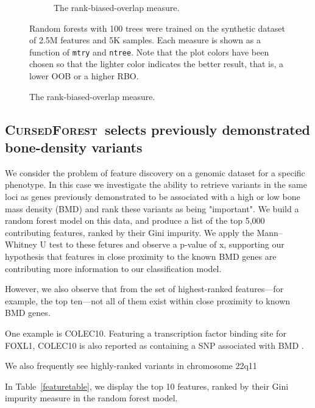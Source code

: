 \documentclass[10pt,letterpaper]{article}
\newcommand{\cursedforest}{\textsc{CursedForest}\xspace}
\newcommand{\mtry}{\texttt{mtry}\xspace}
\newcommand{\ntree}{\texttt{ntree}\xspace}
\begin{document}
\begin{figure}[tbhp]
\begin{adjustwidth}{-1.00in}{0in}
\begin{subfigure}[b]{0.5\linewidth}
      \caption{The rank-biased-overlap measure.} 
      \label{figure:rbo-prod.png} 
      \vspace{4ex}
    \end{subfigure} 
    \begin{flushleft} 
      Random forests with 100 trees were trained on the synthetic dataset of 2.5M features and 5K samples.
      Each measure is shown as a function of \mtry and \ntree. Note that the plot colors have been chosen so that the lighter color indicates
      the better result, that is, a lower OOB or a higher RBO.
    \end{flushleft}
  \end{adjustwidth}
\end{figure}

\subsection{\cursedforest\ selects previously demonstrated bone-density variants}
We consider the problem of feature discovery on a genomic dataset for a specific phenotype.
In this case we investigate the ability to retrieve variants in the same loci as genes previously demonstrated to
be associated with a high or low bone mass density (BMD) and rank these variants as being "important".
We build a random forest model on this data, and produce a list of the top 5,000 contributing features, ranked by their
Gini impurity. We apply the Mann–Whitney U test to these fetures and observe a p-value of x, supporting our hypothesis
that features in close proximity to the known BMD genes are contributing more information to our classification model.

However, we also observe that from the set of highest-ranked features---for example, the top ten---not all of them exist
within close proximity to known BMD genes.

One example is COLEC10. Featuring a transcription factor binding site for FOXL1, COLEC10 is also reported as containing a SNP
associated with BMD \cite{Liu2008}.

We also frequently see highly-ranked variants in chromosome 22q11


In Table~\ref{featuretable}, we display the top 10 features, ranked by their Gini impurity measure in the random forest model.
\end{document}
